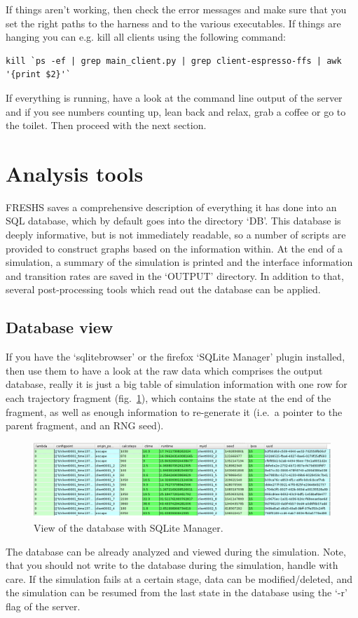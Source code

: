 \documentclass[a4paper,oneside]{article}
\newenvironment{mylisting}
{\begin{list}{}{\setlength{\leftmargin}{1em}}\item\scriptsize\bfseries}
{\end{list}}
\begin{document}
If things aren't working, then check the error messages and make sure that you set the right paths to the harness and to the various executables.  If things are hanging you can e.g. kill all clients using the following command:
\begin{mylisting}
\begin{verbatim}
kill `ps -ef | grep main_client.py | grep client-espresso-ffs | awk '{print $2}'`
\end{verbatim}
\end{mylisting}

If everything is running, have a look at the command line output of the server and if you see numbers counting up, lean back and relax, grab a coffee or go to the toilet. Then proceed with the next section.

\section{Analysis tools}

FRESHS saves a comprehensive description of everything it has done into an SQL database, which by default goes into the directory `DB'.  This database is deeply informative, but is not immediately readable, so a number of scripts are provided to construct graphs based on the information within. At the end of a simulation, a summary of the simulation is printed and the interface information and transition rates are saved in the `OUTPUT' directory. In addition to that, several post-processing tools which read out the database can be applied.

\subsection{Database view}
If you have the `sqlitebrowser' or the firefox `SQLite Manager' plugin installed, then use them to have a look at the raw data which comprises the output database, really it is just a big table of simulation information with one row for each trajectory fragment (fig.~\ref{fig:sqlitemanager}), which contains the state at the end of the fragment, as well as enough information to re-generate it (i.e.~a pointer to the parent fragment, and an RNG seed).
\begin{figure}
 \centering
 \includegraphics[width=0.99\linewidth]{pics/freshs-sqlite-view}
 \caption{View of the database with SQLite Manager.}
 \label{fig:sqlitemanager}
\end{figure}
The database can be already analyzed and viewed during the simulation. Note, that you should not write to the database during the simulation, handle with care. If the simulation fails at a certain stage, data can be modified/deleted, and the simulation can be resumed from the last state in the database using the `-r' flag of the server.
\end{document}
